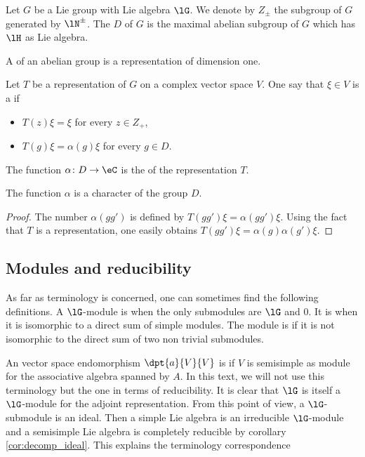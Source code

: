 Let $G$ be a Lie group with Lie algebra $\lG$. We denote by $Z_{\pm}$ the subgroup of $G$ generated by $\lN^{\pm}$. The  $D$ of $G$ is the maximal abelian subgroup of $G$ which has $\lH$ as Lie algebra.

A  of an abelian group is a representation of dimension one.

 Let $T$ be a representation of $G$ on a complex vector space $V$. One say that $\xi\in V$ is a  if
\begin{itemize}
\item $T(z)\xi=\xi$ for every $z\in Z_+$,
\item $T(g)\xi=\alpha(g)\xi$ for every $g\in D$.
\end{itemize}
The function $\alpha\colon D\to \eC$ is the  of the representation $T$.

\begin{lemma}
    The function $\alpha$ is a character of the group $D$.
\end{lemma}

\begin{proof}
    The number $\alpha(gg')$ is defined by $T(gg')\xi=\alpha(gg')\xi$. Using the fact that $T$ is a representation, one easily obtains $T(gg')\xi=\alpha(g)\alpha(g')\xi$. 
\end{proof}

\subsection{Modules and reducibility}

As far as terminology is concerned, one can sometimes find the following definitions. A $\lG$-module is  when the only submodules are $\lG$ and $0$. It is  when it is isomorphic to a direct sum of simple modules. The module is  if it is not isomorphic to the direct sum of two non trivial submodules.

An vector space endomorphism $\dpt{a}{V}{V}$ is  if $V$ is semisimple as module for the associative algebra spanned by $A$. In this text, we will not use this terminology but the one in terms of reducibility. It is clear that $\lG$ is itself a $\lG$-module for the adjoint representation. From this point of view, a $\lG$-submodule is an ideal. Then a simple Lie algebra is an irreducible $\lG$-module and a semisimple Lie algebra is completely reducible by corollary \ref{cor:decomp_ideal}. This explains the terminology correspondence

